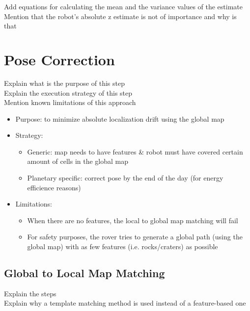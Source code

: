 \noindent
Add equations for calculating the mean and the variance values of the estimate\\
Mention that the robot's absolute z estimate is not of importance and why is that

\section{Pose Correction}

Explain what is the purpose of this step\\
Explain the execution strategy of this step\\
Mention known limitations of this approach

\begin{itemize}
    \item Purpose: to minimize absolute localization drift using the global map
    \item Strategy:
        \begin{itemize}
            \item Generic: map needs to have features \& robot must have covered certain amount of cells in the global map
            \item Planetary specific: correct pose by the end of the day (for energy efficience reasons)
        \end{itemize}
    \item Limitations:
        \begin{itemize}
            \item When there are no features, the local to global map matching will fail
            \item For safety purposes, the rover tries to generate a global path (using the global map) with as few features (i.e. rocks/craters) as possible
        \end{itemize}
\end{itemize}

\subsection{Global to Local Map Matching}

Explain the steps\\
Explain why a template matching method is used instead of a feature-based one


